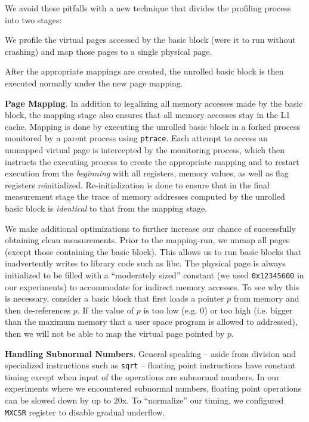 We avoid these pitfalls with a new technique
that divides the profiling process into two stages:
\begin{enumerate*}
\item We profile the virtual pages accessed by
the basic block (were it to run without crashing)
and map those pages to a single physical page.
\item After the appropriate mappings are created,
the unrolled basic block is then executed normally under
the new page mapping.
\end{enumerate*}

\textbf{Page Mapping}. 
In addition to legalizing all memory accesses made by the basic block,
the mapping stage also ensures that all memory accesses stay in
the L1 cache.
Mapping is done by executing the unrolled basic block in a forked process
 monitored by a parent process using \verb|ptrace|.
Each attempt to access an unmapped virtual page is intercepted by
the monitoring process, which then instructs the 
executing process to create the appropriate mapping
and to restart execution from the \textit{beginning}
with all registers, memory values,
as well as flag registers reinitialized.
Re-initialization is done to ensure that in the final measurement
stage the trace of memory addresses computed by the 
unrolled basic block is \textit{identical} to that from the mapping stage.

We make additional optimizations to further
increase our chance of successfully obtaining clean measurements.
Prior to the mapping-run,
we unmap all pages (except those containing the basic block).
This allows us to run basic blocks that inadvertently
writes to library code such as libc.
The physical page is
always initialized to be filled with a “moderately sized” constant
(we used \verb|0x12345600| in our experiments)
to accommodate for indirect memory accesses.
To see why this is necessary,
consider a basic block that first loads a pointer $p$ from memory
and then de-references $p$.
If the value of $p$ is too low (e.g. 0)
or too high
(i.e. bigger than the maximum memory that
a user space program is allowed to addressed),
then we will not be able to map the virtual page pointed by $p$.

\textbf{Handling Subnormal Numbers}.
General speaking -- aside from division
and specialized instructions such as \verb|sqrt|
-- floating point instructions have constant timing
except when input of the operations are subnormal numbers.
In our experiments where we encountered subnormal numbers,
floating point operations can be slowed down by up to 20x.
To ``normalize'' our timing, we configured \verb|MXCSR| register
to disable gradual underflow.

